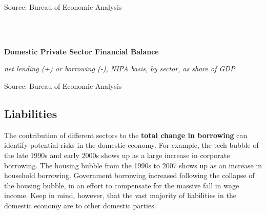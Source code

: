 \documentclass{report}
\makeatletter
\newcommand{\tbllink}[1]{\href{https://raw.githubusercontent.com/bdecon/US-chartbook/master/chartbook/data/#1}{\faTable}}
\newcommand*\short[1]{\expandafter\@gobbletwo\number\numexpr#1\relax}
\newcommand{\sbar}[4]{
		\addplot[ybar stacked, bar width=2.6pt, draw opacity=0, fill=#1] 
			table [x=#2, y=#3, col sep=comma]{#4};}
\newcommand{\dateaxisticks}{
		date coordinates in=x, axis line style={draw=none},
		xmax={2020-08-10},
		max space between ticks=40,	    
		xtick={{1990-01-01}, {1992-01-01}, {1994-01-01}, 
			{1996-01-01}, {1998-01-01}, {2000-01-01}, 
			{2002-01-01}, {2004-01-01}, {2006-01-01},
			{2008-01-01}, {2010-01-01}, {2012-01-01}, {2014-01-01},
		    {2016-01-01}, {2018-01-01}, {2020-01-01}},
		minor xtick={{1989-01-01}, {1991-01-01}, {1993-01-01},
			{1995-01-01}, {1997-01-01}, {1999-01-01}, 
			{2001-01-01}, {2003-01-01}, {2005-01-01}, {2007-01-01},
		    {2009-01-01}, {2011-01-01}, {2013-01-01}, {2015-01-01},
		    {2017-01-01}, {2019-01-01}},
		enlarge y limits={0.06}, enlarge x limits={0.01},
		}
\newcommand{\bbar}[2]{extra #1 ticks = {{#2}}, extra #1 tick labels = ,
		extra #1 tick style = {grid=major, grid style={thick, black!25}},}
\newcommand{\rbars}{
		\fill[color=black!10] (axis cs:{1990-07-01},\pgfkeysvalueof{/pgfplots/ymin}) rectangle 
			(axis cs:{1991-03-01}, \pgfkeysvalueof{/pgfplots/ymax});
		\fill[color=black!10] (axis cs:{2007-12-01},\pgfkeysvalueof{/pgfplots/ymin}) rectangle 
			(axis cs:{2009-07-01}, \pgfkeysvalueof{/pgfplots/ymax});
		\fill[color=black!10] (axis cs:{2001-03-01},\pgfkeysvalueof{/pgfplots/ymin}) rectangle 
			(axis cs:{2001-11-01}, \pgfkeysvalueof{/pgfplots/ymax});
		\fill[color=black!10] (axis cs:{2020-02-01},\pgfkeysvalueof{/pgfplots/ymin}) rectangle 
			(axis cs:{2020-09-01}, \pgfkeysvalueof{/pgfplots/ymax});}
\makeatother
\begin{document}
{{\begin{minipage}{0.76\textwidth}
\footnotesize{Source: Bureau of Economic Analysis} \hfill \tbllink{sectbal.csv} 

\vspace{5mm}

\small  \\

\\

\vspace{1mm}

\normalsize \textbf{Domestic Private Sector Financial Balance}

\footnotesize{\textit{net lending (+) or borrowing (-), NIPA basis, by sector, as share of GDP}}

\hspace*{-3mm} 

\footnotesize{Source: Bureau of Economic Analysis} \hfill \tbllink{sectbal2.csv}

\end{minipage}

\newpage

\begin{minipage}{0.76\textwidth}

\subsection*{\color{black!70} \seriffont Liabilities}

\small The contribution of different sectors to the \textbf{total change in borrowing} can identify potential risks in the domestic economy. For example, the tech bubble of the late 1990s and early 2000s shows up as a large increase in corporate borrowing. The housing bubble from the 1990s to 2007 shows up as an increase in household borrowing. Government borrowing increased following the collapse of the housing bubble, in an effort to compensate for the massive fall in wage income. Keep in mind, however, that the vast majority of liabilities in the domestic economy are to other domestic parties.\\


\end{minipage}}}
\end{document}
